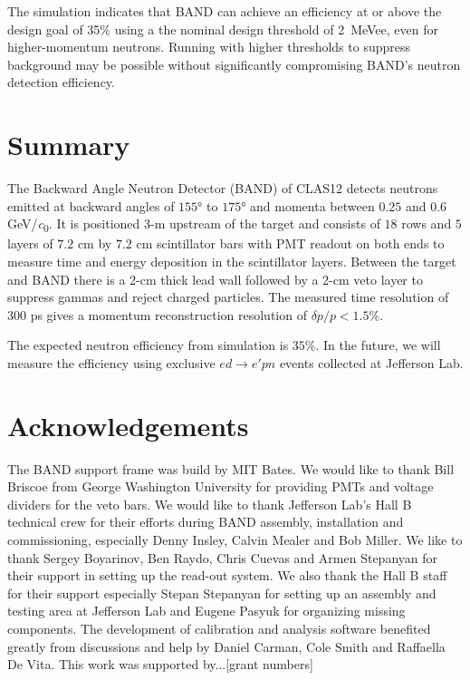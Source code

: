 \documentclass[3p,final,twocolumn]{elsarticle}
\begin{document}
The simulation indicates that BAND can achieve an efficiency at or
above the design goal of 35\% using a the nominal design threshold of 
2~MeVee, even for higher-momentum neutrons. Running with higher thresholds to suppress background
may be possible without significantly compromising BAND's neutron
detection efficiency.



\section{Summary}
The Backward Angle Neutron Detector (BAND) of CLAS12 detects neutrons
  emitted at backward angles of $155$\si{\degree} to $175$\si{\degree}
  and momenta between $0.25$ and $0.6$ \si{\GeV/\clight}. It is
  positioned 3-\si{\meter} upstream of the target and consists of $18$
  rows and $5$ layers of $7.2$ \si{\centi\meter} by $7.2$
  \si{\centi\meter} scintillator bars with PMT readout on both ends to
  measure time and energy deposition in the scintillator
  layers. Between the target and BAND there is a 2-\si{\centi\meter}
  thick lead wall followed by a 2-\si{\centi\meter} veto layer to
  suppress gammas and reject charged particles. The measured time
  resolution of 300 ps gives a  momentum
  reconstruction resolution of $\delta p/p < 1.5$\%.
 

The expected neutron efficiency from simulation is $35$\%. In the
future, we will measure the efficiency using exclusive $ed \rightarrow e'pn$
events collected at Jefferson Lab.


\section*{Acknowledgements}
The BAND support frame was build by MIT Bates. We would like to thank Bill Briscoe from George Washington University for providing PMTs and voltage dividers for the veto bars.
We would like to thank Jefferson Lab's Hall B technical crew for their efforts during BAND assembly, installation and commissioning, especially Denny Insley, Calvin Mealer and Bob Miller.
We like to thank Sergey Boyarinov, Ben Raydo, Chris Cuevas and Armen Stepanyan for their support in setting up the read-out system.
We also thank the Hall B staff for their support especially Stepan Stepanyan for setting up an assembly and testing area at Jefferson Lab and Eugene Pasyuk for organizing missing components.
The development of calibration and analysis software benefited greatly from discussions and help by Daniel Carman, Cole Smith and Raffaella De Vita.
This work was supported by...[grant numbers]
\end{document}
